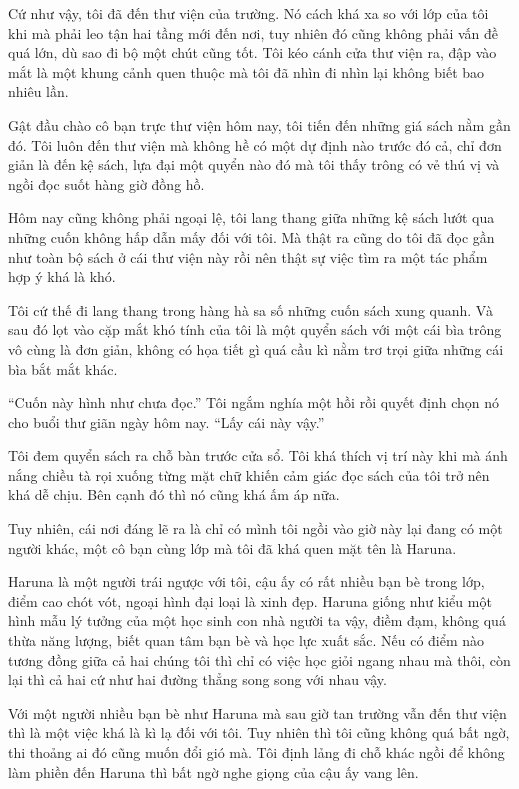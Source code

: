 {Cứ như vậy, tôi đã đến thư viện của trường. Nó cách khá xa so với lớp
của tôi khi mà phải leo tận hai tầng mới đến nơi, tuy nhiên đó cũng
không phải vấn đề quá lớn, dù sao đi bộ một chút cũng tốt. Tôi kéo cánh
cửa thư viện ra, đập vào mắt là một khung cảnh quen thuộc mà tôi đã nhìn
đi nhìn lại không biết bao nhiêu lần.

Gật đầu chào cô bạn trực thư viện hôm nay, tôi tiến đến những giá sách
nằm gần đó. Tôi luôn đến thư viện mà không hề có một dự định nào trước
đó cả, chỉ đơn giản là đến kệ sách, lựa đại một quyển nào đó mà tôi thấy
trông có vẻ thú vị và ngồi đọc suốt hàng giờ đồng hồ.

Hôm nay cũng không phải ngoại lệ, tôi lang thang giữa những kệ sách lướt
qua những cuốn không hấp dẫn mấy đối với tôi. Mà thật ra cũng do tôi đã
đọc gần như toàn bộ sách ở cái thư viện này rồi nên thật sự việc tìm ra
một tác phẩm hợp ý khá là khó.

Tôi cứ thế đi lang thang trong hàng hà sa số những cuốn sách xung quanh.
Và sau đó lọt vào cặp mắt khó tính của tôi là một quyển sách với một cái
bìa trông vô cùng là đơn giản, không có họa tiết gì quá cầu kì nằm trơ
trọi giữa những cái bìa bắt mắt khác.

``Cuốn này hình như chưa đọc.'' Tôi ngắm nghía một hồi rồi quyết định
chọn nó cho buổi thư giãn ngày hôm nay. ``Lấy cái này vậy.''

Tôi đem quyển sách ra chỗ bàn trước cửa sổ. Tôi khá thích vị trí này khi
mà ánh nắng chiều tà rọi xuống từng mặt chữ khiến cảm giác đọc sách của
tôi trở nên khá dễ chịu. Bên cạnh đó thì nó cũng khá ấm áp nữa.

Tuy nhiên, cái nơi đáng lẽ ra là chỉ có mình tôi ngồi vào giờ này lại
đang có một người khác, một cô bạn cùng lớp mà tôi đã khá quen mặt tên
là Haruna.

Haruna là một người trái ngược với tôi, cậu ấy có rất nhiều bạn bè trong
lớp, điểm cao chót vót, ngoại hình đại loại là xinh đẹp. Haruna giống
như kiểu một hình mẫu lý tưởng của một học sinh con nhà người ta vậy,
điềm đạm, không quá thừa năng lượng, biết quan tâm bạn bè và học lực
xuất sắc. Nếu có điểm nào tương đồng giữa cả hai chúng tôi thì chỉ có
việc học giỏi ngang nhau mà thôi, còn lại thì cả hai cứ như hai đường
thẳng song song với nhau vậy.

Với một người nhiều bạn bè như Haruna mà sau giờ tan trường vẫn đến thư
viện thì là một việc khá là kì lạ đối với tôi. Tuy nhiên thì tôi cũng
không quá bất ngờ, thi thoảng ai đó cũng muốn đổi gió mà. Tôi định lảng
đi chỗ khác ngồi để không làm phiền đến Haruna thì bất ngờ nghe giọng
của cậu ấy vang lên.

}
